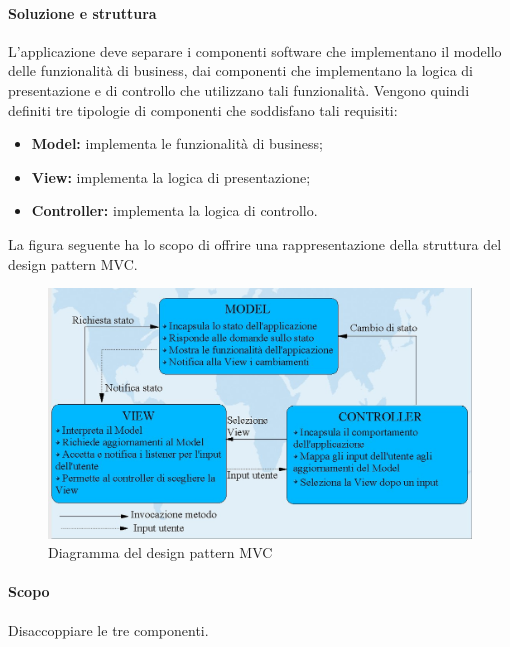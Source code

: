 \paragraph{Soluzione e struttura\\}
L'applicazione deve separare i componenti software che implementano il modello delle funzionalità di business, dai componenti che implementano la logica di presentazione e di controllo che utilizzano tali funzionalità. Vengono quindi definiti tre tipologie di componenti che soddisfano tali requisiti: 
\begin{itemize}
\item \textbf{Model:} implementa le funzionalità di business;
\item \textbf{View:} implementa la logica di presentazione;
\item \textbf{Controller:} implementa la logica di controllo.
\end{itemize}
La figura seguente ha lo scopo di offrire una rappresentazione della struttura del design pattern\glossario{} MVC.
\begin{figure} [!h]
	\centering
	\includegraphics[width=\linewidth]{./Content/Immagini/mvc.jpg}
	\caption{Diagramma del design pattern MVC}
	\label{figMVC}
\end{figure}

\paragraph{Scopo\\}
Disaccoppiare le tre componenti.

